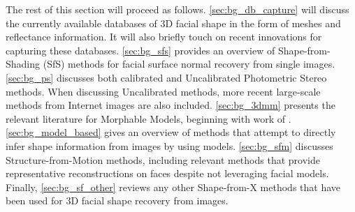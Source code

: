 The rest of this section will proceed as follows. \cref{sec:bg_db_capture} will
discuss the currently available databases of 3D facial shape in the form
of meshes and reflectance information. It will also briefly touch on recent
innovations for capturing these databases. \cref{sec:bg_sfs} provides an overview
of Shape-from-Shading (SfS) methods for facial surface normal recovery from
single images. \cref{sec:bg_ps} discusses both calibrated and
Uncalibrated Photometric Stereo methods. When discussing Uncalibrated methods,
more recent large-scale methods from Internet images are also included.
\cref{sec:bg_3dmm} presents the relevant literature for Morphable Models,
beginning with work of \citet{volker1999morphable}.
\cref{sec:bg_model_based} gives an
overview of methods that attempt to directly infer shape information from images
by using models. \cref{sec:bg_sfm} discusses Structure-from-Motion methods,
including relevant methods that provide representative reconstructions
on faces despite not leveraging facial models. Finally, \cref{sec:bg_sf_other}
reviews any other Shape-from-X methods that have been used for 3D facial
shape recovery from images.







\stopcontents[chapters]
